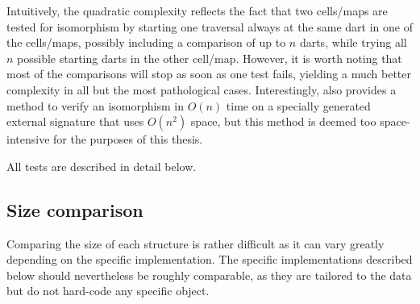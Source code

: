 Intuitively, the quadratic complexity reflects the fact that two cells/maps are tested for isomorphism by starting one traversal always at the same dart in one of the cells/maps, possibly including a comparison of up to $n$ darts, while trying all $n$ possible starting darts in the other cell/map.
However, it is worth noting that most of the comparisons will stop as soon as one test fails, yielding a much better complexity in all but the most pathological cases.
Interestingly, \citet{Gosselin11} also provides a method to verify an isomorphism in $O(n)$ time on a specially generated external signature that uses $O(n^2)$ space, but this method is deemed too space-intensive for the purposes of this thesis.

All tests are described in detail below.

\subsection*{Size comparison}

Comparing the size of each structure is rather difficult as it can vary greatly depending on the specific implementation.
The specific implementations described below should nevertheless be roughly comparable, as they are tailored to the data but do not hard-code any specific object.

